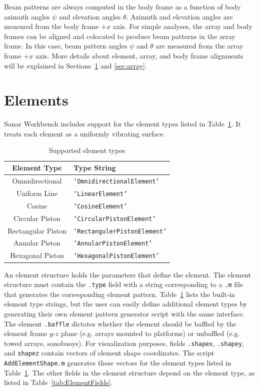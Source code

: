 \documentclass[11pt]{article}
\begin{document}
Beam patterns are always computed in the body frame as a function of body azimuth angles $\psi$ and elevation angles $\theta$. Azimuth and elevation angles are measured from the body frame $+x$ axis. For simple analyses, the array and body frames can be aligned and colocated to produce beam patterns in the array frame. In this case, beam pattern angles $\psi$ and $\theta$ are measured from the array frame $+x$ axis. More details about element, array, and body frame alignments will be explained in Sections~\ref{sec:element} and \ref{sec:array}.

\section{Elements}\label{sec:element}

Sonar Workbench includes support for the element types listed in Table~\ref{tab:ElementTypes}. It treats each element as a uniformly vibrating surface.

\begin{table}[!ht]
	\begin{center}
		\caption{Supported element types}
		\label{tab:ElementTypes}
		\begin{tabular}{c|l} 
			\textbf{Element Type} & \textbf{Type String} \\
			\hline
			Omnidirectional  & \texttt{`OmnidirectionalElement'} \\
			Uniform Line & \texttt{`LinearElement'} \\
			Cosine & \texttt{`CosineElement'} \\
			Circular Piston & \texttt{`CircularPistonElement'} \\
			Rectangular Piston & \texttt{`RectangulerPistonElement'} \\
			Annular Piston & \texttt{`AnnularPistonElement'} \\
			Hexagonal Piston & \texttt{`HexagonalPistonElement'} \\
		\end{tabular}
	\end{center}
\end{table}

An element structure holds the parameters that define the element. The element structure must contain the \texttt{.type} field with a string corresponding to a \texttt{.m} file that generates the corresponding element pattern. Table~\ref{tab:ElementTypes} lists the built-in element type strings, but the user can easily define additional element types by generating their own element pattern generator script with the same interface. The element \texttt{.baffle} dictates whether the element should be baffled by the element frame $y$-$z$ plane (e.g. arrays mounted to platforms) or unbaffled (e.g. towed arrays, sonobuoys). For visualization purposes, fields \texttt{.shapex}, \texttt{.shapey}, and \texttt{shapez} contain vectors of element shape coordinates. The script \texttt{AddElementShape.m} generates these vectors for the element types listed in Table~\ref{tab:ElementTypes}. The other fields in the element structure depend on the element type, as listed in Table~\ref{tab:ElementFields}.
\end{document}
